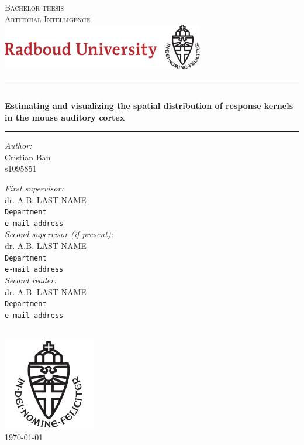 \documentclass[11pt,a4paper, hidelinks]{report}
\begin{document}
\begin{titlepage}
\begin{center}
\textsc{\LARGE Bachelor thesis}\\ [0.5cm]
\textsc{ \LARGE Artificial Intelligence}\\[0.5cm]
\includegraphics[height=2cm]{RU_Text_&_Logo.jpg}

\vspace{0.4cm}
\hrule \text{}\\[0.4cm]
\textbf{\huge Estimating and visualizing the spatial distribution of response kernels in the mouse auditory cortex 
}\\[0.4cm]
\hrule
\vspace{2cm}
\begin{minipage}[t]{0.45\textwidth}
\begin{flushleft} \large
\textit{Author:}\\
Cristian Ban\\
s1095851
\end{flushleft}
\end{minipage}
\begin{minipage}[t]{0.45\textwidth}
\begin{flushright} \large
\textit{First supervisor:}\\
dr. A.B. LAST NAME\\
\texttt{Department}\\
\texttt{e-mail address}\\[1.0cm]
\textit{Second supervisor (if present):}\\
dr. A.B. LAST NAME\\
\texttt{Department}\\
\texttt{e-mail address}\\[1.0cm]
\textit{Second reader:}\\
dr. A.B. LAST NAME\\
\texttt{Department}\\
\texttt{e-mail address}\\[1.3cm]
\end{flushright}
\end{minipage}\\[1cm]
\includegraphics[width=4cm]{Imgs/RU_Logo.png}\\[0.5cm]
{\large \today}
\end{center}
\end{titlepage}
\end{document}
